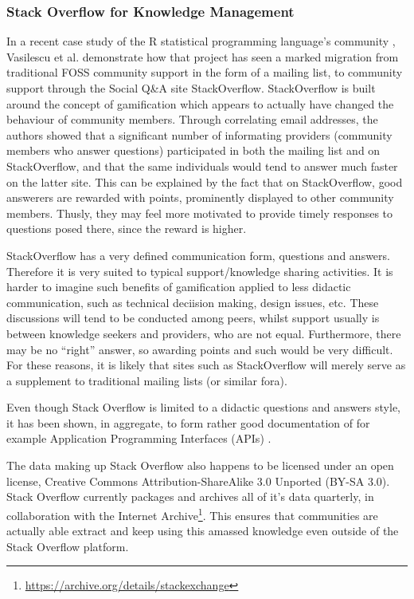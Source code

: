 \documentclass[a4paper,11pt]{article} %
\begin{document}
\subsubsection{Stack Overflow for Knowledge Management}
In a recent case study of the R statistical programming language's
community \cite{Vasilescu14StackOverflow}, Vasilescu et
al. demonstrate how that project has seen a marked migration from
traditional FOSS community support in the form of a mailing list, to
community support through the Social Q\&{}A site
StackOverflow. StackOverflow is built around the concept of
gamification\cite{deterding2011game} which appears to actually have
changed the behaviour of community members. Through correlating email
addresses, the authors showed that a significant number of informating
providers (community members who answer questions) participated in
both the mailing list and on StackOverflow, and that the same
individuals would tend to answer much faster on the latter site. This
can be explained by the fact that on StackOverflow, good answerers are
rewarded with points, prominently displayed to other community
members. Thusly, they may feel more motivated to provide timely
responses to questions posed there, since the reward is higher.


StackOverflow has a very defined communication form, questions and
answers. Therefore it is very suited to typical support/knowledge
sharing activities. It is harder to imagine such benefits of
gamification applied to less didactic communication, such as technical
deciision making, design issues, etc. These discussions will tend to
be conducted among peers, whilst support usually is between knowledge
seekers and providers, who are not equal. Furthermore, there may be no
``right'' answer, so awarding points and such would be very
difficult. For these reasons, it is likely that sites such as
StackOverflow will merely serve as a supplement to traditional mailing
lists (or similar fora).

Even though Stack Overflow is limited to a didactic questions and
answers style, it has been shown, in aggregate, to form rather good
documentation of for example Application Programming Interfaces (APIs)
\cite{parnin2012crowd}.

The data making up Stack Overflow also happens to be licensed under an
open license, Creative Commons Attribution-ShareAlike 3.0 Unported
(BY-SA 3.0). Stack Overflow currently packages and archives all of
it's data quarterly, in collaboration with the Internet
Archive\footnote{\url{https://archive.org/details/stackexchange}}. This
ensures that communities are actually able extract and keep using this
amassed knowledge even outside of the Stack Overflow platform.
\end{document}
